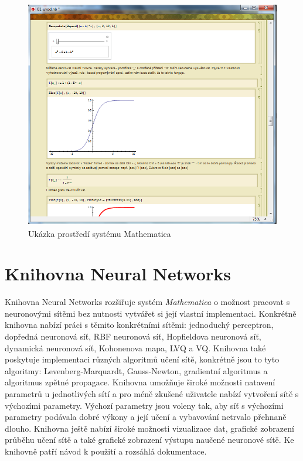 \documentclass[11pt,twoside,a4paper]{book}
\begin{document}
\begin{figure}[!h]
\begin{center}
\includegraphics[height=10cm]{figures/ukazka01.png}
\caption{Ukázka prostředí systému Mathematica}
\label{fig:prostredi}
\end{center}
\end{figure}

\section{Knihovna Neural Networks}
Knihovna Neural Networks rozšiřuje systém \textit{Mathematica} o možnost pracovat s neuronovými sítěmi bez nutnosti vytvářet si její vlastní implementaci. Konkrétně knihovna nabízí práci s těmito konkrétními sítěmi: jednoduchý perceptron, dopředná neuronová síť, RBF neuronová síť, Hopfieldova neuronová síť, dynamická neuronová síť, Kohonenova mapa, LVQ a VQ. Knihovna také poskytuje implementaci různých algoritmů učení sítě, konkrétně jsou to tyto algoritmy: Levenberg-Marquardt, Gauss-Newton, gradientní algoritmus a algoritmus zpětné propagace. Knihovna umožňuje široké možnosti natavení parametrů u jednotlivých sítí a pro méně zkušené uživatele nabízí vytvoření sítě s výchozími parametry. Výchozí parametry jsou voleny tak, aby síť s výchozími parametry podávala dobré výkony a její učení a vybavování netrvalo přehnaně dlouho. Knihovna ještě nabízí široké možnosti vizualizace dat, grafické zobrazení průběhu učení sítě a také grafické zobrazení výstupu naučené neuronové sítě. Ke knihovně patří návod k použití a rozsáhlá dokumentace.
\end{document}
